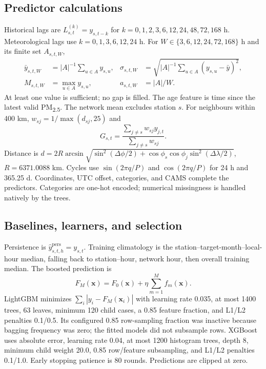\documentclass[11pt,a4paper]{article}
\begin{document}
\subsection{Predictor calculations}
Historical lags are $L^{(k)}_{s,t}=y_{s,t-k}$ for $k=0,1,2,3,6,12,24,48,72,168$ h. Meteorological lags use $k=0,1,3,6,12,24$ h. For $W\in\{3,6,12,24,72,168\}$ h and its finite set $A_{s,t,W}$,
\begin{align}
\bar y_{s,t,W}&=|A|^{-1}\sum_{u\in A}y_{s,u}, &
\sigma_{s,t,W}&=\sqrt{|A|^{-1}\sum_{u\in A}(y_{s,u}-\bar y)^2},\\
M_{s,t,W}&=\max_{u\in A}y_{s,u}, & a_{s,t,W}&=|A|/W.
\end{align}
At least one value is sufficient; no gap is filled. The age feature is time since the latest valid PM\textsubscript{2.5}. The network mean excludes station $s$. For neighbours within 400 km, $w_{sj}=1/\max(d_{sj},25)$ and
\begin{equation} G_{s,t}=\frac{\sum_{j\ne s}w_{sj}y_{j,t}}{\sum_{j\ne s}w_{sj}}. \end{equation}
Distance is $d=2R\arcsin\sqrt{\sin^2(\Delta\phi/2)+\cos\phi_s\cos\phi_j\sin^2(\Delta\lambda/2)}$, $R=6371.0088$ km. Cycles use $\sin(2\pi q/P)$ and $\cos(2\pi q/P)$ for 24 h and 365.25 d. Coordinates, UTC offset, categories, and CAMS complete the predictors. Categories are one-hot encoded; numerical missingness is handled natively by the trees.

\subsection{Baselines, learners, and selection}
Persistence is $\hat y^{\mathrm{pers}}_{s,t,h}=y_{s,t}$. Training climatology is the station--target-month--local-hour median, falling back to station--hour, network hour, then overall training median. The boosted prediction is
\begin{equation} F_M(\mathbf x)=F_0(\mathbf x)+\eta\sum_{m=1}^M f_m(\mathbf x). \end{equation}
LightGBM minimizes $\sum_i|y_i-F_M(\mathbf x_i)|$ with learning rate 0.035, at most 1400 trees, 63 leaves, minimum 120 child cases, a 0.85 feature fraction, and L1/L2 penalties 0.1/0.5. Its configured 0.85 row-sampling fraction was inactive because bagging frequency was zero; the fitted models did not subsample rows. XGBoost uses absolute error, learning rate 0.04, at most 1200 histogram trees, depth 8, minimum child weight 20.0, 0.85 row/feature subsampling, and L1/L2 penalties 0.1/1.0. Early stopping patience is 80 rounds. Predictions are clipped at zero.
\end{document}
